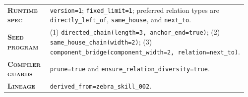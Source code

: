 \begin{table}[htbp]
\centering
\begin{minipage}{0.97\textwidth}
\raggedright
\small
\setlength{\tabcolsep}{3pt}
\renewcommand{\arraystretch}{1.16}
\vspace{0.35em}
\begin{tabular}{@{}>{\raggedright\arraybackslash\bfseries}p{0.17\linewidth} >{\raggedright\arraybackslash}p{0.79\linewidth}@{}}
    \textsc{Runtime spec} & \texttt{version=1}; \texttt{fixed\_limit=1}; preferred relation types are \texttt{directly\_left\_of}, \texttt{same\_house}, and \texttt{next\_to}. \\
    \textsc{Seed program} & (1) \texttt{directed\_chain(length=3, anchor\_end=true)}; (2) \texttt{same\_house\_chain(width=2)}; (3) \texttt{component\_bridge(component\_width=2, relation=next\_to)}. \\
    \textsc{Compiler guards} & \texttt{prune=true} and \texttt{ensure\_relation\_diversity=true}. \\
    \textsc{Lineage} & \texttt{derived\_from=zebra\_skill\_002}. \\
\end{tabular}
\vspace{0.45em}
\end{minipage}
\end{table}

